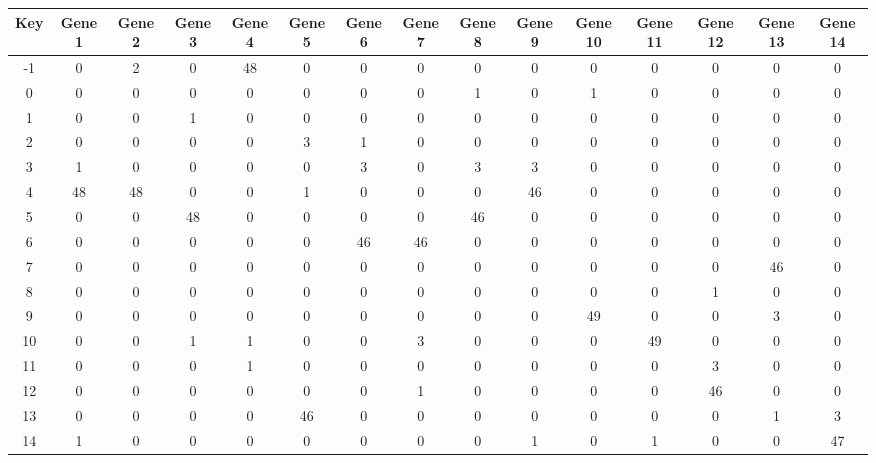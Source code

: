 \begin{tabular}{|c|c|c|c|c|c|c|c|c|c|c|c|c|c|c|}
\hline
Key & Gene 1 & Gene 2 & Gene 3 & Gene 4 & Gene 5 & Gene 6 & Gene 7 & Gene 8 & Gene 9 & Gene 10 & Gene 11 & Gene 12 & Gene 13 & Gene 14 \\
\hline
-1 & 0 & 2 & 0 & 48 & 0 & 0 & 0 & 0 & 0 & 0 & 0 & 0 & 0 & 0 \\
0 & 0 & 0 & 0 & 0 & 0 & 0 & 0 & 1 & 0 & 1 & 0 & 0 & 0 & 0 \\
1 & 0 & 0 & 1 & 0 & 0 & 0 & 0 & 0 & 0 & 0 & 0 & 0 & 0 & 0 \\
2 & 0 & 0 & 0 & 0 & 3 & 1 & 0 & 0 & 0 & 0 & 0 & 0 & 0 & 0 \\
3 & 1 & 0 & 0 & 0 & 0 & 3 & 0 & 3 & 3 & 0 & 0 & 0 & 0 & 0 \\
4 & 48 & 48 & 0 & 0 & 1 & 0 & 0 & 0 & 46 & 0 & 0 & 0 & 0 & 0 \\
5 & 0 & 0 & 48 & 0 & 0 & 0 & 0 & 46 & 0 & 0 & 0 & 0 & 0 & 0 \\
6 & 0 & 0 & 0 & 0 & 0 & 46 & 46 & 0 & 0 & 0 & 0 & 0 & 0 & 0 \\
7 & 0 & 0 & 0 & 0 & 0 & 0 & 0 & 0 & 0 & 0 & 0 & 0 & 46 & 0 \\
8 & 0 & 0 & 0 & 0 & 0 & 0 & 0 & 0 & 0 & 0 & 0 & 1 & 0 & 0 \\
9 & 0 & 0 & 0 & 0 & 0 & 0 & 0 & 0 & 0 & 49 & 0 & 0 & 3 & 0 \\
10 & 0 & 0 & 1 & 1 & 0 & 0 & 3 & 0 & 0 & 0 & 49 & 0 & 0 & 0 \\
11 & 0 & 0 & 0 & 1 & 0 & 0 & 0 & 0 & 0 & 0 & 0 & 3 & 0 & 0 \\
12 & 0 & 0 & 0 & 0 & 0 & 0 & 1 & 0 & 0 & 0 & 0 & 46 & 0 & 0 \\
13 & 0 & 0 & 0 & 0 & 46 & 0 & 0 & 0 & 0 & 0 & 0 & 0 & 1 & 3 \\
14 & 1 & 0 & 0 & 0 & 0 & 0 & 0 & 0 & 1 & 0 & 1 & 0 & 0 & 47 \\
\hline
\end{tabular}